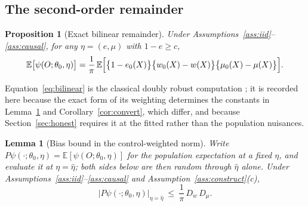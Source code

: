 \documentclass[11pt]{article}
\theoremstyle{plain}
\newtheorem{lemma}[theorem]{Lemma}
\newtheorem{proposition}[theorem]{Proposition}
\theoremstyle{definition}
\theoremstyle{remark}
\newcommand{\E}{\mathbb{E}}
\newcommand{\ez}{e_0}
\newcommand{\mz}{\mu_0}
\newcommand{\wz}{w_0}
\newcommand{\Dw}{D_w}
\newcommand{\Dm}{D_\mu}
\begin{document}
\subsection{The second-order remainder}

\begin{proposition}[Exact bilinear remainder]\label{prop:bilinear}
Under Assumptions~\ref{ass:iid}--\ref{ass:causal}, for any $\eta=(e,\mu)$ with
$1-e\ge c$,
\begin{equation}\label{eq:bilinear}
  \E\bigl[\psi(O;\theta_0,\eta)\bigr]
  =\frac1\pi\,\E\Bigl[\bigl\{1-\ez(X)\bigr\}
   \bigl\{\wz(X)-w(X)\bigr\}\bigl\{\mz(X)-\mu(X)\bigr\}\Bigr].
\end{equation}
\end{proposition}

Equation~\eqref{eq:bilinear} is the classical doubly robust computation
\citep{robins1995,vanderlaan2003,kennedy2024}; it is recorded here because the
exact form of its weighting determines the constants in
Lemma~\ref{lem:biasbound} and Corollary~\ref{cor:convert}, which differ, and
because Section~\ref{sec:honest} requires it at the fitted rather than the
population nuisances.


\begin{lemma}[Bias bound in the control-weighted norm]\label{lem:biasbound}
Write $P\psi(\cdot;\theta_0,\eta)=\E[\psi(O;\theta_0,\eta)]$ for the population
expectation at a \emph{fixed} $\eta$, and evaluate it at $\eta=\widehat\eta$; both
sides below are then random through $\widehat\eta$ alone. Under
Assumptions~\ref{ass:iid}--\ref{ass:causal} and
Assumption~\ref{ass:construct}(c),
\[
  \bigl\lvert P\psi(\cdot;\theta_0,\eta)\bigr\rvert_{\eta=\widehat\eta}
  \ \le\ \frac1\pi\,\Dw\,\Dm .
\]
\end{lemma}
\end{document}
